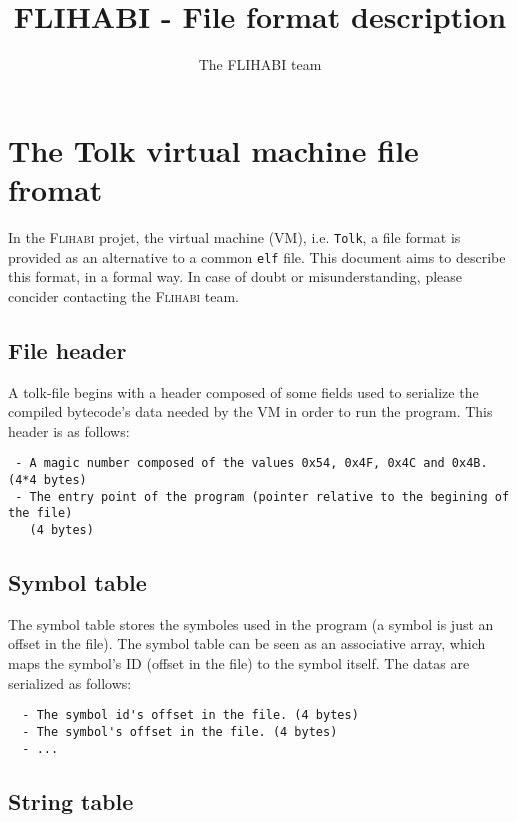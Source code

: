 \documentclass[11pt,a4paper]{article}
\title{\textsc{FLIHABI} - File format description}
\author{The \textsc{FLIHABI} team}
\begin{document}
\maketitle
\newpage

\section{The Tolk virtual machine file fromat}

In the \textsc{Flihabi} projet, the virtual machine (VM), i.e. \texttt{Tolk},
a file format is provided as an alternative to a common \texttt{elf} file. This
document aims to describe this format, in a formal way. In case of doubt or
misunderstanding, please concider contacting the \textsc{Flihabi} team.

\subsection{File header}

A tolk-file begins with a header composed of some fields used to serialize the
compiled bytecode's data needed by the VM in order to run the program. This
header is as follows:

\begin{verbatim}
 - A magic number composed of the values 0x54, 0x4F, 0x4C and 0x4B. (4*4 bytes)
 - The entry point of the program (pointer relative to the begining of the file)
   (4 bytes)
\end{verbatim}

\subsection{Symbol table}

The symbol table stores the symboles used in the program (a symbol is just an
offset in the file). The symbol table can be seen as an associative array, which
maps the symbol's ID (offset in the file) to the symbol itself. The datas are
serialized as follows:

\begin{verbatim}
  - The symbol id's offset in the file. (4 bytes)
  - The symbol's offset in the file. (4 bytes)
  - ...
\end{verbatim}

\subsection{String table}
\end{document}
